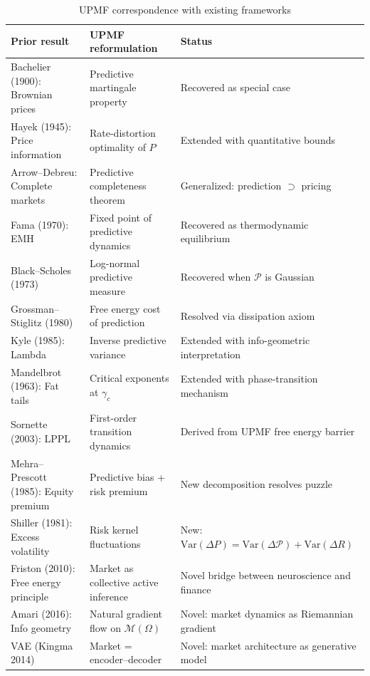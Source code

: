\documentclass[12pt,a4paper]{article}
\theoremstyle{definition}
\newcommand{\M}{\mathcal{M}}
\newcommand{\PP}{\mathcal{P}}
\newcommand{\Var}{\mathrm{Var}}
\begin{document}
\begin{table}[H]
\centering
\caption{UPMF correspondence with existing frameworks}
\label{tab:correspondence}
\small
\begin{tabularx}{\textwidth}{lXX}
\toprule
\textbf{Prior result} & \textbf{UPMF reformulation} & \textbf{Status} \\
\midrule
Bachelier (1900): Brownian prices & Predictive martingale property & Recovered as special case \\
\addlinespace
Hayek (1945): Price information & Rate-distortion optimality of $P$ & Extended with quantitative bounds \\
\addlinespace
Arrow--Debreu: Complete markets & Predictive completeness theorem & Generalized: prediction $\supset$ pricing \\
\addlinespace
Fama (1970): EMH & Fixed point of predictive dynamics & Recovered as thermodynamic equilibrium \\
\addlinespace
Black--Scholes (1973) & Log-normal predictive measure & Recovered when $\PP$ is Gaussian \\
\addlinespace
Grossman--Stiglitz (1980) & Free energy cost of prediction & Resolved via dissipation axiom \\
\addlinespace
Kyle (1985): Lambda & Inverse predictive variance & Extended with info-geometric interpretation \\
\addlinespace
Mandelbrot (1963): Fat tails & Critical exponents at $\gamma_c$ & Extended with phase-transition mechanism \\
\addlinespace
Sornette (2003): LPPL & First-order transition dynamics & Derived from UPMF free energy barrier \\
\addlinespace
Mehra--Prescott (1985): Equity premium & Predictive bias + risk premium & New decomposition resolves puzzle \\
\addlinespace
Shiller (1981): Excess volatility & Risk kernel fluctuations & New: $\Var(\Delta P) = \Var(\Delta \PP) + \Var(\Delta R)$ \\
\addlinespace
Friston (2010): Free energy principle & Market as collective active inference & Novel bridge between neuroscience and finance \\
\addlinespace
Amari (2016): Info geometry & Natural gradient flow on $\M(\Omega)$ & Novel: market dynamics as Riemannian gradient \\
\addlinespace
VAE (Kingma 2014) & Market = encoder--decoder & Novel: market architecture as generative model \\
\bottomrule
\end{tabularx}
\end{table}
\end{document}
